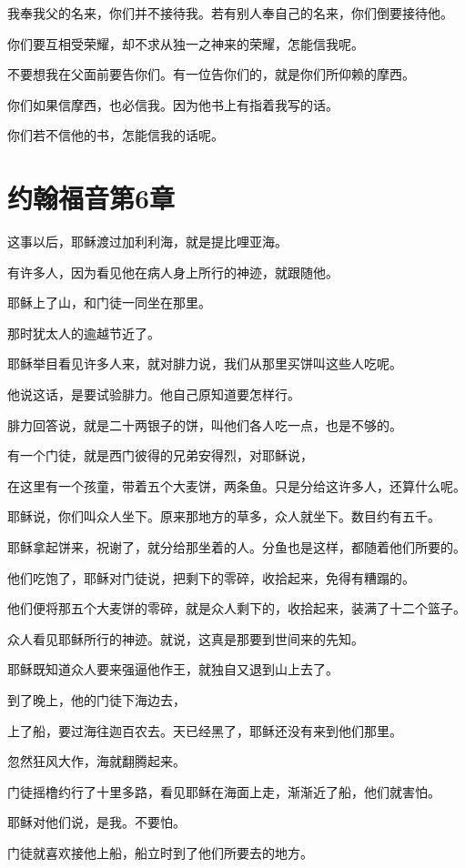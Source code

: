 \documentclass[12pt,oneside]{book}
\begin{document}
我奉我父的名来，你们并不接待我。若有别人奉自己的名来，你们倒要接待他。

你们要互相受荣耀，却不求从独一之神来的荣耀，怎能信我呢。

不要想我在父面前要告你们。有一位告你们的，就是你们所仰赖的摩西。

你们如果信摩西，也必信我。因为他书上有指着我写的话。

你们若不信他的书，怎能信我的话呢。

\chapter{约翰福音第6章}
这事以后，耶稣渡过加利利海，就是提比哩亚海。

有许多人，因为看见他在病人身上所行的神迹，就跟随他。

耶稣上了山，和门徒一同坐在那里。

那时犹太人的逾越节近了。

耶稣举目看见许多人来，就对腓力说，我们从那里买饼叫这些人吃呢。

他说这话，是要试验腓力。他自己原知道要怎样行。

腓力回答说，就是二十两银子的饼，叫他们各人吃一点，也是不够的。

有一个门徒，就是西门彼得的兄弟安得烈，对耶稣说，

在这里有一个孩童，带着五个大麦饼，两条鱼。只是分给这许多人，还算什么呢。

耶稣说，你们叫众人坐下。原来那地方的草多，众人就坐下。数目约有五千。

耶稣拿起饼来，祝谢了，就分给那坐着的人。分鱼也是这样，都随着他们所要的。

他们吃饱了，耶稣对门徒说，把剩下的零碎，收拾起来，免得有糟蹋的。

他们便将那五个大麦饼的零碎，就是众人剩下的，收拾起来，装满了十二个篮子。

众人看见耶稣所行的神迹。就说，这真是那要到世间来的先知。

耶稣既知道众人要来强逼他作王，就独自又退到山上去了。

到了晚上，他的门徒下海边去，

上了船，要过海往迦百农去。天已经黑了，耶稣还没有来到他们那里。

忽然狂风大作，海就翻腾起来。

门徒摇橹约行了十里多路，看见耶稣在海面上走，渐渐近了船，他们就害怕。

耶稣对他们说，是我。不要怕。

门徒就喜欢接他上船，船立时到了他们所要去的地方。
\end{document}
